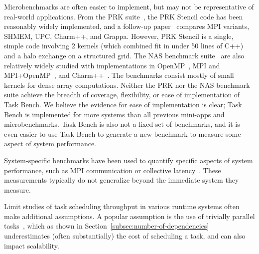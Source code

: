 Microbenchmarks are often easier to implement, but may not be
representative of real-world applications. From the PRK
suite~\cite{PRK14}, the PRK Stencil code has been reasonably widely
implemented, and a follow-up paper~\cite{PRKRuntimes16} compares MPI
variants, SHMEM, UPC, Charm++, and Grappa. However, PRK Stencil is a
single, simple code involving 2 kernels (which combined fit in under 50 lines
of C++) and a halo exchange on a structured grid. The NAS benchmark suite~\cite{NAS91, NAS95} are also relatively widely studied with
implementations in OpenMP~\cite{NASOpenMP99}, MPI and
MPI+OpenMP~\cite{NASMPIOpenMP00}, and
Charm++~\cite{NASCharm96}. The benchmarks consist mostly of small
kernels for dense array computations. Neither the PRK nor the NAS
benchmark suite achieve the breadth of coverage, flexibility, or ease
of implementation of Task Bench. We believe the evidence for ease of
implementation is clear; Task Bench is implemented for more systems
than all previous mini-apps and microbenchmarks. Task Bench is also
not a fixed set of benchmarks, and it is even easier to use Task Bench
to generate a new benchmark to measure some aspect of system
performance.

System-specific benchmarks have been used to quantify specific aspects
of system performance, such as MPI communication or collective
latency~\cite{MPPTest99, MPIBench01}. These measurements typically do
not generalize beyond the immediate system they measure.

Limit studies of task scheduling throughput in various runtime systems
often make additional assumptions. A popular assumption is the use of
trivially parallel tasks~\cite{Canary16, Armstrong14}, which as shown
in Section~\ref{subsec:number-of-dependencies} underestimates (often
substantially) the cost of scheduling a task, and can also impact scalability.
